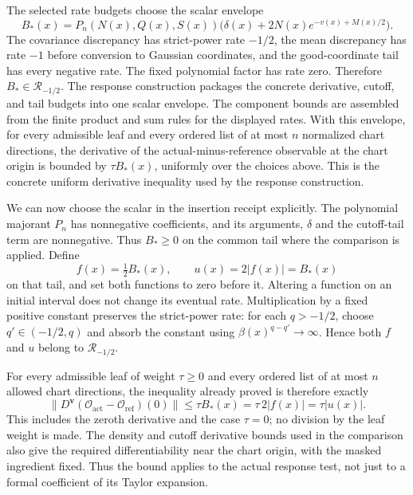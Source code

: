 The selected rate budgets choose the scalar envelope
\[
 B_*(x)=P_n(N(x),Q(x),S(x))
             \bigl(\delta(x)+2N(x)e^{-v(x)+M(x)/2}\bigr).
\]
The covariance discrepancy has strict-power rate $-1/2$, the mean
discrepancy has rate $-1$ before conversion to Gaussian coordinates, and
the good-coordinate tail has every negative rate. The fixed polynomial
factor has rate zero. Therefore $B_*\in\mathcal R_{-1/2}$.
The response construction packages the concrete derivative, cutoff, and
tail budgets into one scalar envelope. The component bounds are assembled
from the finite product and sum rules for the displayed rates. With this
envelope, for every admissible leaf and every ordered list of at most $n$
normalized chart directions, the derivative of the actual-minus-reference
observable at the chart origin is bounded by $\tau B_*(x)$, uniformly over
the choices above. This is the concrete uniform derivative inequality used
by the response construction.

We can now choose the scalar in the insertion receipt explicitly. The
polynomial majorant $P_n$ has nonnegative coefficients, and its arguments,
$\delta$ and the cutoff-tail term are nonnegative. Thus $B_*\ge0$ on
the common tail where the comparison is applied. Define
\begin{equation}\label{eq:ex-lattice-eve-concrete-amplitude}
 f(x)=\tfrac12 B_*(x),\qquad u(x)=2|f(x)|=B_*(x)
\end{equation}
on that tail, and set both functions to zero before it. Altering a
function on an initial interval does not change its eventual rate.
Multiplication by a fixed positive constant preserves the strict-power
rate: for each $q>-1/2$, choose $q'\in(-1/2,q)$ and absorb the
constant using $\beta(x)^{q-q'}\to\infty$. Hence both $f$ and $u$
belong to $\mathcal R_{-1/2}$.

For every admissible leaf of weight $\tau\ge0$ and every ordered list
of at most $n$ allowed chart directions, the inequality already proved
is therefore exactly
\[
 \bigl\|D^{\mathbf v}(\mathcal O_{\mathrm{act}}
                  -\mathcal O_{\mathrm{ref}})(0)\bigr\|
 \le\tau B_*(x)=\tau\,2|f(x)|=\tau|u(x)|.
\]
This includes the zeroth derivative and the case $\tau=0$; no division
by the leaf weight is made. The density and cutoff derivative bounds
used in the comparison also give the required differentiability near
the chart origin, with the masked ingredient fixed. Thus the bound
applies to the actual response test, not just to a formal coefficient
of its Taylor expansion.

